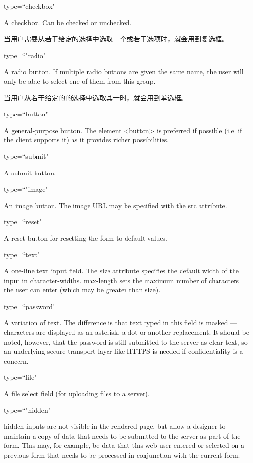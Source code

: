 \begin{compactitem}
\item  type=``checkbox"

A checkbox. Can be checked or unchecked.

当用户需要从若干给定的选择中选取一个或若干选项时，就会用到复选框。

\item type=``"radio"

A radio button. If multiple radio buttons are given the same name, the user will only be able to select one of them from this group.

当用户从若干给定的的选择中选取其一时，就会用到单选框。

 \item type=``button"

A general-purpose button. The element <button> is preferred if possible (i.e. if the client supports it) as it provides richer possibilities.

\item  type=``submit"

A submit button.

 \item type=``"image"

An image button. The image URL may be specified with the src attribute.

 \item type=``reset"

A reset button for resetting the form to default values.

 \item type=``text"

A one-line text input field. The size attribute specifies the default width of the input in character-widths. max-length sets the maximum number of characters the user can enter (which may be greater than size).

 \item type=``password"

A variation of text. The difference is that text typed in this field is masked — characters are displayed as an asterisk, a dot or another replacement. It should be noted, however, that the password is still submitted to the server as clear text, so an underlying secure transport layer like HTTPS is needed if confidentiality is a concern.

 \item type=``file"

A file select field (for uploading files to a server).

 \item type=``"hidden"

hidden inputs are not visible in the rendered page, but allow a designer to maintain a copy of data that needs to be submitted to the server as part of the form. This may, for example, be data that this web user entered or selected on a previous form that needs to be processed in conjunction with the current form.


\end{compactitem}


